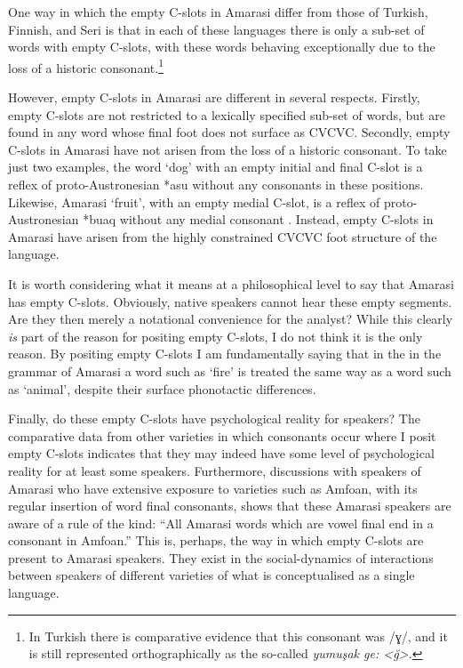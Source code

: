 One way in which the empty C-slots in Amarasi differ from those of Turkish, Finnish, and Seri
is that in each of these languages there is only a sub-set of words with empty C-slots,
with these words behaving exceptionally due to the loss of a historic consonant.\footnote{
		In Turkish there is comparative evidence that this consonant was /ɣ/,
		and it is still represented orthographically as the so-called \it{yumu\c{s}ak ge}: <\u{g}>.}

However, empty C-slots in Amarasi are different in several respects.
Firstly, empty C-slots are not restricted to a lexically specified sub-set of words,
but are found in any word whose final foot does not surface as CVCVC.
Secondly, empty C-slots in Amarasi have not arisen from the loss of a historic consonant.
To take just two examples, the word  `dog' with an empty initial
and final C-slot is a reflex of proto-Austronesian *asu without any consonants in these positions.
Likewise, Amarasi  `fruit', with an empty medial C-slot,
is a reflex of proto-Austronesian *buaq without any medial consonant \citep{bltr}.
Instead, empty C-slots in Amarasi have arisen from the highly
constrained CVCVC foot structure of the language.

It is worth considering what it means at a philosophical
level to say that Amarasi has empty C-slots.
Obviously, native speakers cannot hear these empty segments.
Are they then merely a notational convenience for the analyst?
While this clearly \emph{is} part of the reason for positing empty C-slots,
I do not think it is the only reason.
By positing empty C-slots I am fundamentally saying
that in the in the grammar of Amarasi a word such as  `fire' is 
treated the same way as a word such as  `animal',
despite their surface phonotactic differences.

Finally, do these empty C-slots have psychological reality for speakers?
The comparative data from other varieties in which consonants occur where I posit
empty C-slots indicates that they may indeed
have some level of psychological reality for at least some speakers.
Furthermore, discussions with speakers of Amarasi
who have extensive exposure to varieties such as Amfo{\Q}an,
with its regular insertion of word final consonants,
shows that these Amarasi speakers are aware of a rule of the kind:
``All Amarasi words which are vowel final end in a consonant in Amfo{\Q}an.''
This is, perhaps, the way in which empty C-slots are present to Amarasi speakers.
They exist in the social-dynamics of interactions between
speakers of different varieties of what is conceptualised
as a single language.